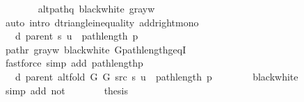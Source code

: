 \begin{isabellebody}
\ \ \ \ \ \ \isamarkupfalse%
\ alt{\isacharunderscore}{\kern0pt}path{\isacharunderscore}{\kern0pt}q\ black{\isacharunderscore}{\kern0pt}white\ gray{\isacharunderscore}{\kern0pt}w\isanewline
\ \ \ \ \ \ \isamarkupfalse%
\ {\isacharparenleft}{\kern0pt}auto\ intro{\isacharcolon}{\kern0pt}\ d{\isacharunderscore}{\kern0pt}triangle{\isacharunderscore}{\kern0pt}inequality\ add{\isacharunderscore}{\kern0pt}right{\isacharunderscore}{\kern0pt}mono{\isacharparenright}{\kern0pt}\isanewline
\ \ \ \ \isamarkupfalse%
\ \isamarkupfalse%
\ {\isachardoublequoteopen}{\isachardot}{\kern0pt}{\isachardot}{\kern0pt}{\isachardot}{\kern0pt}\ {\isasymle}\ d\ {\isacharparenleft}{\kern0pt}parent\ s{\isacharparenright}{\kern0pt}\ u\ {\isacharplus}{\kern0pt}\ path{\isacharunderscore}{\kern0pt}length\ p{\isachardoublequoteclose}\isanewline
\ \ \ \ \ \ \isamarkupfalse%
\ path{\isacharunderscore}{\kern0pt}r\ gray{\isacharunderscore}{\kern0pt}w\ black{\isacharunderscore}{\kern0pt}white\ G{\isachardot}{\kern0pt}path{\isacharunderscore}{\kern0pt}length{\isacharunderscore}{\kern0pt}geq{\isacharunderscore}{\kern0pt}{}I\isanewline
\ \ \ \ \ \ \isamarkupfalse%
\ {\isacharparenleft}{\kern0pt}fastforce\ simp\ add{\isacharcolon}{\kern0pt}\ path{\isacharunderscore}{\kern0pt}length{\isacharunderscore}{\kern0pt}p{\isacharparenright}{\kern0pt}\isanewline
\ \ \ \ \isamarkupfalse%
\ \isamarkupfalse%
\ {\isachardoublequoteopen}{\isachardot}{\kern0pt}{\isachardot}{\kern0pt}{\isachardot}{\kern0pt}\ {\isacharequal}{\kern0pt}\ d\ {\isacharparenleft}{\kern0pt}parent\ {\isacharparenleft}{\kern0pt}alt{\isacharunderscore}{\kern0pt}fold\ G{}\ G{}\ src\ s{\isacharparenright}{\kern0pt}{\isacharparenright}{\kern0pt}\ u\ {\isacharplus}{\kern0pt}\ path{\isacharunderscore}{\kern0pt}length\ p{\isachardoublequoteclose}\isanewline
\ \ \ \ \ \ \isamarkupfalse%
\ black{\isacharunderscore}{\kern0pt}white\isanewline
\ \ \ \ \ \ \isamarkupfalse%
\ {\isacharparenleft}{\kern0pt}simp\ add{\isacharcolon}{\kern0pt}\ not{\isacharunderscore}{\kern0pt}{\isacharparenleft}{\kern0pt}{}{\isacharparenright}{\kern0pt}{\isacharparenright}{\kern0pt}\isanewline
\ \ \ \ \isamarkupfalse%
\ \isamarkupfalse%
\ {\isacharquery}{\kern0pt}thesis\isanewline
\ \ \ \ \ \ \isacommand{{\isachardot}{\kern0pt}}\isamarkupfalse%
\isanewline
\ \ \isamarkupfalse%
\isanewline
\ \ \ \ \isamarkupfalse%

\end{isabellebody}
